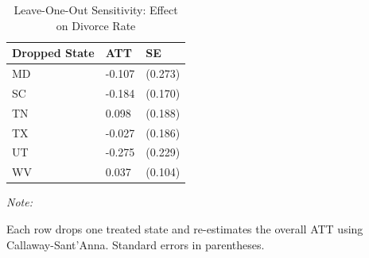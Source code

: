 \begin{table}[!h]
\centering
\caption{\label{tab:loo}Leave-One-Out Sensitivity: Effect on Divorce Rate}
\centering
\begin{threeparttable}
\begin{tabular}[t]{lll}
\toprule
Dropped State & ATT & SE\\
\midrule
MD & -0.107 & (0.273)\\
SC & -0.184 & (0.170)\\
TN & 0.098 & (0.188)\\
TX & -0.027 & (0.186)\\
UT & -0.275 & (0.229)\\
\addlinespace
WV & 0.037 & (0.104)\\
\bottomrule
\end{tabular}
\begin{tablenotes}
\item \textit{Note: } 
\item Each row drops one treated state and re-estimates the overall ATT using Callaway-Sant'Anna. Standard errors in parentheses.
\end{tablenotes}
\end{threeparttable}
\end{table}
